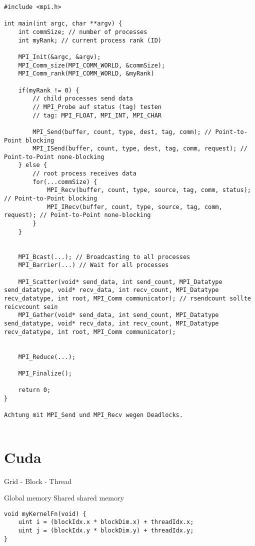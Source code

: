 \documentclass{article}
\begin{document}
\begin{multicols}{2}
\begin{listing}[H]
\begin{verbatim}
#include <mpi.h>

int main(int argc, char **argv) {
    int commSize; // number of processes
    int myRank; // current process rank (ID)

    MPI_Init(&argc, &argv);
    MPI_Comm_size(MPI_COMM_WORLD, &commSize);
    MPI_Comm_rank(MPI_COMM_WORLD, &myRank)
    
    if(myRank != 0) {
        // child processes send data
        // MPI_Probe auf status (tag) testen
        // tag: MPI_FLOAT, MPI_INT, MPI_CHAR
        
        MPI_Send(buffer, count, type, dest, tag, comm); // Point-to-Point blocking
        MPI_ISend(buffer, count, type, dest, tag, comm, request); // Point-to-Point none-blocking
    } else {
        // root process receives data
        for(...commSize) {
            MPI_Recv(buffer, count, type, source, tag, comm, status); // Point-to-Point blocking
            MPI_IRecv(buffer, count, type, source, tag, comm, request); // Point-to-Point none-blocking
        }
    }
    
    
    MPI_Bcast(...); // Broadcasting to all processes
    MPI_Barrier(...) // Wait for all processes
    
    MPI_Scatter(void* send_data, int send_count, MPI_Datatype send_datatype, void* recv_data, int recv_count, MPI_Datatype recv_datatype, int root, MPI_Comm communicator); // rsendcount sollte reicvcount sein
    MPI_Gather(void* send_data, int send_count, MPI_Datatype send_datatype, void* recv_data, int recv_count, MPI_Datatype recv_datatype, int root, MPI_Comm communicator);
    
    
    MPI_Reduce(...);
    
    MPI_Finalize();
    
    return 0;
}

Achtung mit MPI_Send und MPI_Recv wegen Deadlocks.


\end{verbatim}
\end{listing}

\section{Cuda}

Grid - Block - Thread


Global memory
Shared shared memory 


\begin{verbatim}
void myKernelFn(void) {
    uint i = (blockIdx.x * blockDim.x) + threadIdx.x;
    uint j = (blockIdx.y * blockDim.y) + threadIdx.y;
}


\end{verbatim}
\end{multicols}
\end{document}
